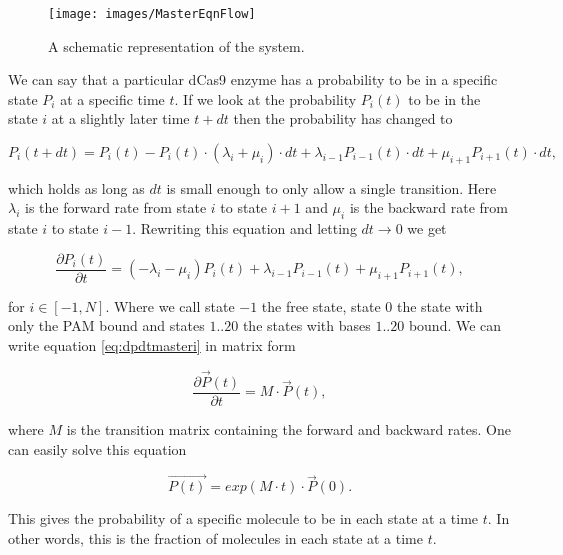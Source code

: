 \begin{figure}[H]
\begin{center}
\texttt{[image: images/MasterEqnFlow]}
\label{fig:mastereqn_schematic}
\caption{A schematic representation of the system.}
\end{center}
\end{figure}

We can say that a particular dCas9 enzyme has a probability to be in a specific state $P_i$ at a specific time  $t$. If we look at the probability $P_i(t)$ to be in the state $i$ at a slightly later time $t+dt$ then the probability has changed to

\begin{equation}
P_i(t+dt) = P_i(t) - P_i(t)\cdot (\lambda_i + \mu_i)\cdot dt + \lambda_{i-1}P_{i-1}(t)\cdot dt + \mu_{i+1}P_{i+1}(t)\cdot dt,
\end{equation}

which holds as long as $dt$ is small enough to only allow a single transition. Here $\lambda_i$ is the forward rate from state $i$ to state $i+1$ and $\mu_i$ is the backward rate from state $i$ to state $i-1$. Rewriting this equation and letting $dt \rightarrow 0$ we get

\begin{equation}
\label{eq:dpdtmasteri}
\frac{\partial P_i(t)}{\partial t} = (-\lambda_i - \mu_i)P_i(t) + \lambda_{i-1}P_{i-1}(t) + \mu_{i+1}P_{i+1}(t),
\end{equation}

for $i \in [-1,N]$. Where we call state $-1$ the free state, state $0$ the state with only the PAM bound and states $1..20$ the states with bases $1..20$ bound. We can write equation \ref{eq:dpdtmasteri} in matrix form

\begin{equation}
\label{eq:mastermatrix}
\frac{\partial \vec{P}(t)}{\partial t} = M\cdot \vec{P}(t),
\end{equation}

where $M$ is the transition matrix containing the forward and backward rates. One can easily solve this equation

\begin{equation}
\vec{P(t)} = exp(M\cdot t) \cdot \vec{P}(0).
\end{equation}

This gives the probability of a specific molecule to be in each state at a time $t$. In other words, this is the fraction of molecules in each state at a time $t$.

